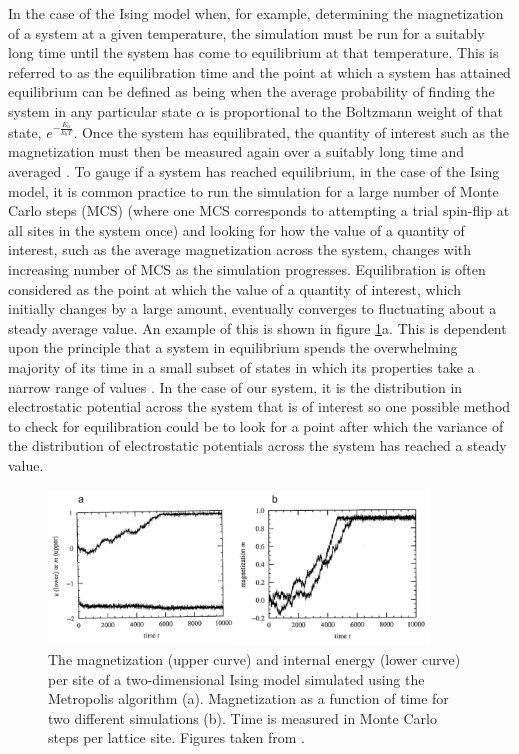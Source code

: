In the case of the Ising model when, for example, determining the magnetization of a system at a given temperature, the simulation must be run for a suitably long time until the system has come to equilibrium at that temperature. This is referred to as the equilibration time and the point at which a system has attained equilibrium can be defined as being when the average probability of finding the system in any particular state $\alpha$ is proportional to the Boltzmann weight of that state, $e^{-\frac{E_\alpha}{k_bT}}$. Once the system has equilibrated, the quantity of interest such as the magnetization must then be measured again over a suitably long time and averaged \cite{MC}. 
To gauge if a system has reached equilibrium, in the case of the Ising model, it is common practice to run the simulation for a large number of Monte Carlo steps (MCS) (where one MCS corresponds to attempting a trial spin-flip at all sites in the system once) and looking for how the value of a quantity of interest, such as the average magnetization across the system, changes with increasing number of MCS as the simulation progresses. Equilibration is often considered as the point at which the value of a quantity of interest, which initially changes by a large amount, eventually converges to fluctuating about a steady average value. An example of this is shown in figure \ref{ising_equil}a. This is dependent upon the principle that a system in equilibrium spends the overwhelming majority of its time in a small subset of states in which its properties take a narrow range of values \cite{MC}. 
In the case of our system, it is the distribution in electrostatic potential across the system that is of interest so one possible method to check for equilibration could be to look for a point after which the variance of the distribution of electrostatic potentials across the system has reached a steady value.
\begin{figure}[h!]
  \centering
    \includegraphics[width=0.9\textwidth]{figures/ising_equil.png}
    \caption{The magnetization (upper curve) and internal energy (lower curve) per site of a two-dimensional Ising model simulated using the Metropolis algorithm (a). Magnetization as a function of time for two different simulations (b). Time is measured in Monte Carlo steps per lattice site. Figures taken from .}
  \label{ising_equil}
\end{figure}

